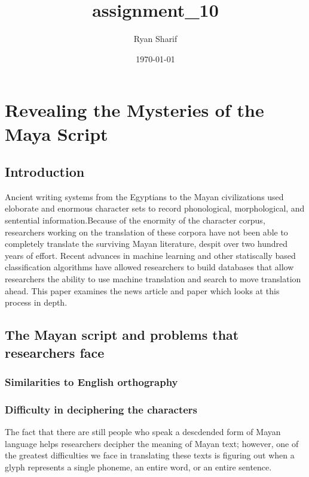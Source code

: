 \documentclass[11pt]{article}
\author{Ryan Sharif}
\date{\today}
\title{assignment\_10}
\begin{document}
\maketitle
\tableofcontents

\section{Revealing the Mysteries of the Maya Script}
\label{sec-1}

\subsection{Introduction}
\label{sec-1-1}
Ancient writing systems from the  Egyptians to the Mayan civilizations
used  eloborate and  enormous character  sets to  record phonological,
morphological, and  sentential information.Because of the  enormity of
the character corpus, researchers working  on the translation of these
corpora have not been able to completely translate the surviving Mayan
literature,     despit      over     two     hundred      years     of
effort\cite{macri_new_2009}. Recent  advances in machine  learning and
other  statiscally   based  classification  algorithms   have  allowed
researchers to build  databases that allow researchers  the ability to
use   machine    translation   and   search   to    move   translation
ahead\cite{hu_multimedia_2015}. This  paper examines the  news article
\cite{bourquenoud_revealing_2015} and  paper \cite{hu_multimedia_2015}
which looks at this process in depth.


\subsection{The Mayan script and problems that researchers face}
\label{sec-1-2}

\subsubsection{Similarities to English orthography}
\label{sec-1-2-1}

\subsubsection{Difficulty in deciphering the characters}
\label{sec-1-2-2}
The fact  that there are still  people who speak a  descdended form of
Mayan language helps  researchers decipher the meaning  of Mayan text;
however, one of the greatest difficulties we face in translating these
texts is  figuring out when  a glyph  represents a single  phoneme, an
entire word, or an entire sentence.
\end{document}
